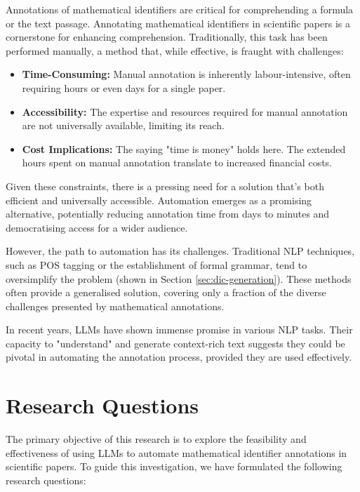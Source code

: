 Annotations of mathematical identifiers are critical for comprehending a formula or the text passage. Annotating mathematical identifiers in scientific papers is a cornerstone for enhancing comprehension. Traditionally, this task has been performed manually, a method that, while effective, is fraught with challenges:

\begin{itemize}
    \item \textbf{Time-Consuming:} Manual annotation is inherently labour-intensive, often requiring hours or even days for a single paper.
    
    \item \textbf{Accessibility:} The expertise and resources required for manual annotation are not universally available, limiting its reach.
    
    \item \textbf{Cost Implications:} The saying "time is money" holds here. The extended hours spent on manual annotation translate to increased financial costs.
\end{itemize}

Given these constraints, there is a pressing need for a solution that's both efficient and universally accessible. Automation emerges as a promising alternative, potentially reducing annotation time from days to minutes and democratising access for a wider audience.

However, the path to automation has its challenges. Traditional \ac{NLP} techniques, such as \ac{POS} tagging or the establishment of formal grammar, tend to oversimplify the problem (shown in Section \ref{sec:dic-generation}). These methods often provide a generalised solution, covering only a fraction of the diverse challenges presented by mathematical annotations. 

In recent years, LLMs have shown immense promise in various NLP tasks. Their capacity to "understand" and generate context-rich text suggests they could be pivotal in automating the annotation process, provided they are used effectively.

\section{Research Questions}

The primary objective of this research is to explore the feasibility and effectiveness of using LLMs to automate mathematical identifier annotations in scientific papers. To guide this investigation, we have formulated the following research questions:


